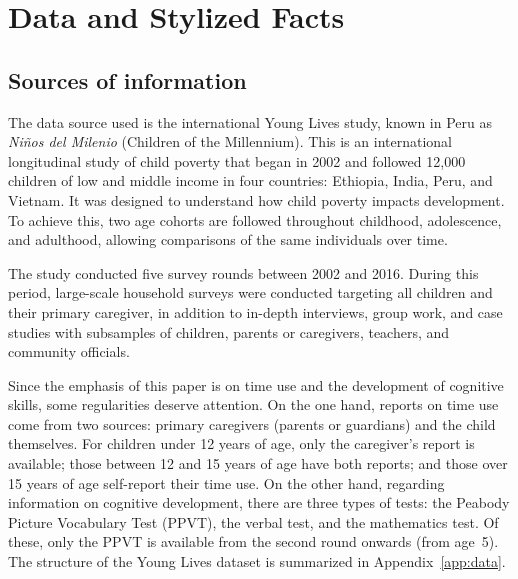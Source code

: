 \documentclass[12pt]{article}
\begin{document}
\section{Data and Stylized Facts}
\label{sec:data}

\subsection{Sources of information}
\label{subsec:datasources}

The data source used is the international Young Lives study, known in Peru as
\textit{Ni\~{n}os del Milenio} (Children of the Millennium). This is an
international longitudinal study of child poverty that began in 2002 and
followed 12,000 children of low and middle income in four countries: Ethiopia,
India, Peru, and Vietnam. It was designed to understand how child poverty
impacts development. To achieve this, two age cohorts are followed throughout
childhood, adolescence, and adulthood, allowing comparisons of the same
individuals over time.

The study conducted five survey rounds between 2002 and 2016. During this
period, large-scale household surveys were conducted targeting all children
and their primary caregiver, in addition to in-depth interviews, group work,
and case studies with subsamples of children, parents or caregivers, teachers,
and community officials.

Since the emphasis of this paper is on time use and the development of
cognitive skills, some regularities deserve attention. On the one hand,
reports on time use come from two sources: primary caregivers (parents or
guardians) and the child themselves. For children under 12 years of age,
only the caregiver's report is available; those between 12 and 15 years of
age have both reports; and those over 15 years of age self-report their time
use. On the other hand, regarding information on cognitive development, there
are three types of tests: the Peabody Picture Vocabulary Test (PPVT), the
verbal test, and the mathematics test. Of these, only the PPVT is available
from the second round onwards (from age~5). The structure of the Young Lives
dataset is summarized in Appendix~\ref{app:data}.
\end{document}

